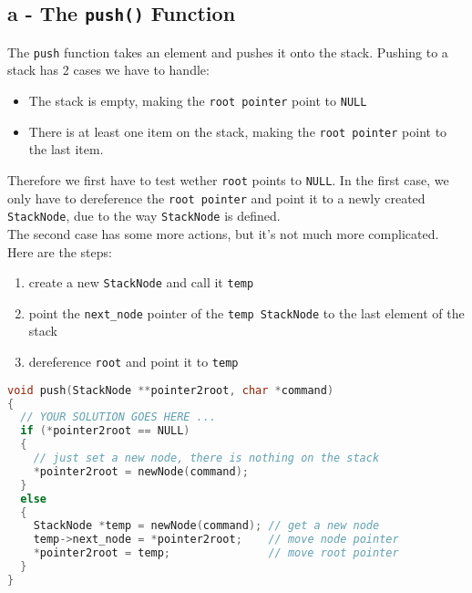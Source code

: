 \documentclass[a4paper, 11pt]{article}
\begin{document}
    \subsection{a - The \texttt{push()} Function}
    The \texttt{push} function takes an element and pushes it onto the stack.
    Pushing to a stack has 2 cases we have to handle:
    \begin{itemize}
        \item The stack is empty, making the \texttt{root pointer} point to \lstinline{NULL}
        \item There is at least one item on the stack, making the \texttt{root pointer} point to the last item.
    \end{itemize}
    Therefore we first have to test wether \texttt{root} points to \lstinline{NULL}. 
    In the first case, we only have to dereference the \texttt{root pointer} and point it to a newly created 
    \texttt{StackNode}, due to the way \texttt{StackNode} is defined.
    \\
    The second case has some more actions, but it's not much more complicated. Here are the steps:
    \begin{enumerate}
        \item create a new \texttt{StackNode} and call it \texttt{temp}
        \item point the \texttt{next\_node} pointer of the \texttt{temp StackNode} to the 
              last element of the stack
        \item dereference \texttt{root} and point it to \texttt{temp}
    \end{enumerate}
    \begin{lstlisting}[language=C,caption={The \texttt{push()} Function},label={push}]
void push(StackNode **pointer2root, char *command)
{
  // YOUR SOLUTION GOES HERE ...
  if (*pointer2root == NULL)
  {
    // just set a new node, there is nothing on the stack
    *pointer2root = newNode(command); 
  }
  else
  {
    StackNode *temp = newNode(command); // get a new node
    temp->next_node = *pointer2root;    // move node pointer
    *pointer2root = temp;               // move root pointer
  }
}
    \end{lstlisting}

\end{document}
